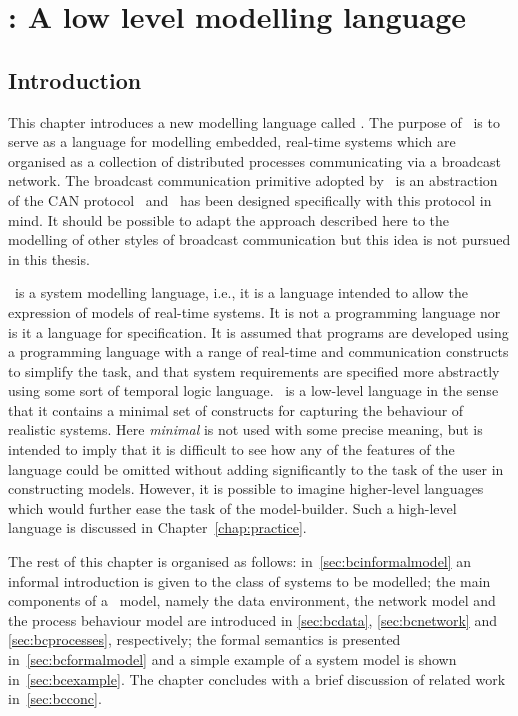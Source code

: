 \chapter{\bcandle: A low level modelling language} \label{chap:bcandle}
\section{Introduction \label{sec:bcintro}}
This chapter introduces a new modelling language called \bcandle. The
purpose of \bcandle\ is to serve as a language for modelling embedded,
real-time systems which are organised as a collection of distributed
processes communicating via a broadcast network. The broadcast
communication primitive adopted by \bcandle\ is an abstraction of the
CAN protocol~\cite{iso:11898} and \bcandle\ has been designed
specifically with this protocol in mind. It should be possible to
adapt the approach described here to the modelling of other styles of
broadcast communication but this idea is not pursued in this thesis.

\bcandle\ is a system modelling language, i.e., it is a language intended
to allow the expression of models of real-time systems. It is not a
programming language nor is it a language for specification. It is
assumed that programs are developed using a programming language with
a range of real-time and communication constructs to simplify the task, and
that system requirements are specified more abstractly using
some sort of temporal logic language. \bcandle\ is a low-level
language in the sense that it contains a minimal set of constructs for
capturing the behaviour of realistic systems. Here
\emph{minimal} is not used with some precise meaning, but is intended to 
imply that it is difficult to see how any of the features of the
language could be omitted without adding significantly to the task of
the user in constructing models. However, it is possible to
imagine higher-level languages which would further ease the task of
the model-builder. Such a high-level language is discussed in 
Chapter~\ref{chap:practice}. 

The rest of this chapter is organised as follows:
in~\Sec\ref{sec:bcinformalmodel} an informal introduction is given to
the class of systems to be modelled; the main components of a
\bcandle\ model, namely the data environment, the network model and
the process behaviour model are introduced in \Sec\ref{sec:bcdata},
\Sec\ref{sec:bcnetwork} and \Sec\ref{sec:bcprocesses}, respectively;
the formal semantics is presented in~\Sec\ref{sec:bcformalmodel} and a
simple example of a system model is shown
in~\Sec\ref{sec:bcexample}. The chapter concludes with a brief
discussion of related work in~\Sec\ref{sec:bcconc}.


